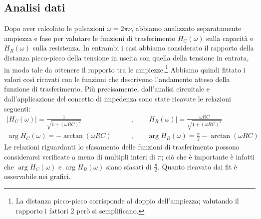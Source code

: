 \documentclass[a4paper]{article}
\begin{document}
\subsection{Analisi dati}
Dopo aver calcolato le pulsazioni $\omega = 2\pi \nu$, abbiamo analizzato separatamente ampiezza e fase per valutare le funzioni di trasferimento $H_C(\omega)$ sulla capacità e $H_R(\omega)$ sulla resistenza. In entrambi i casi abbiamo considerato il rapporto della distanza picco-picco della tensione in uscita con quella della tensione in entrata, in modo tale da ottenere il rapporto tra le ampiezze.\footnote{La distanza picco-picco corrisponde al doppio dell'ampiezza; valutando il rapporto i fattori 2 però si semplificano.}
Abbiamo quindi fittato i valori così ricavati con le funzioni che descrivono l'andamento atteso della funzione di trasferimento. Più precisamente, dall'analisi circuitale e dall'applicazione del concetto di impedenza sono state ricavate le relazioni seguenti:
\begin{align}
|H_C(\omega)| = \frac{1}{\sqrt{1 + (\omega RC)^2}} \qquad & \text{,} \qquad |H_R(\omega)| = \frac{\omega RC}{\sqrt{1 + (\omega RC)^2}} \label{eq:ampiezza RC} \\
\arg H_C(\omega) = -\arctan(\omega RC) \qquad & \text{,} \qquad \arg H_R(\omega) = \frac{\pi}{2}-\arctan(\omega RC) \label{eq: fase RC}
\end{align}
Le relazioni riguardanti lo sfasamento delle funzioni di trasferimento possono considerarsi verificate a meno di multipli interi di $\pi$; ciò che è importante è infatti che $\arg H_C(\omega)$ e $\arg H_R(\omega)$ siano sfasati di $\frac{\pi}{2}$.
Quanto ricavato dai fit è osservabile nei grafici.
\end{document}
